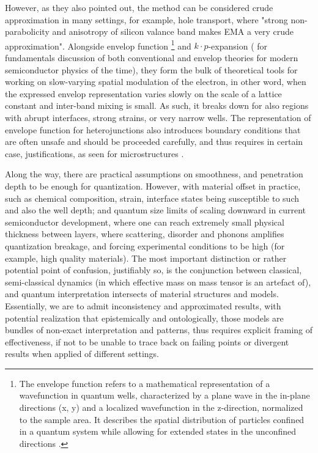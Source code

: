 However, as they also pointed out, the method can be considered crude approximation in many settings, for example, hole transport, where "strong non-parabolicity and anisotropy of silicon valance band makes EMA a very crude approximation". Alongside envelop function \footnote{The envelope function refers to a mathematical representation of a wavefunction in quantum wells, characterized by a plane wave in the in-plane directions (x, y) and a localized wavefunction in the z-direction, normalized to the sample area. It describes the spatial distribution of particles confined in a quantum system while allowing for extended states in the unconfined directions \cite{EnvelopeFunctionOverview}.} and $k\cdot p$-expansion \cite{Li_2014} (\cite{M_G_Burt_1999} for fundamentals discussion of both conventional and envelop theories for modern semiconductor physics of the time), they form the bulk of theoretical tools for working on slow-varying spatial modulation of the electron, in other word, when the expressed envelop representation varies slowly on the scale of a lattice constant and inter-band mixing is small. As such, it breaks down for also regions with abrupt interfaces, strong strains, or very narrow wells. The representation of envelope function for heterojunctions also introduces boundary conditions that are often unsafe and should be proceeded carefully, and thus requires in certain case, justifications, as seen for microstructures \cite{Burt1992TheJF}. 

Along the way, there are practical assumptions on smoothness, and penetration depth to be enough for quantization. However, with material offset in practice, such as chemical composition, strain, interface states being susceptible to such and also the well depth; and quantum size limits of scaling downward in current semiconductor development, where one can reach extremely small physical thickness between layers, where scattering, disorder and phonons amplifies quantization breakage, and forcing experimental conditions to be high (for example, high quality materials). The most important distinction or rather potential point of confusion, justifiably so, is the conjunction between classical, semi-classical dynamics (in which effective mass on mass tensor is an artefact of), and quantum interpretation intersects of material structures and models. Essentially, we are to admit inconsistency and approximated results, with potential realization that epistemically and ontologically, those models are bundles of non-exact interpretation and patterns, thus requires explicit framing of effectiveness, if not to be unable to trace back on failing points or divergent results when applied of different settings. 


